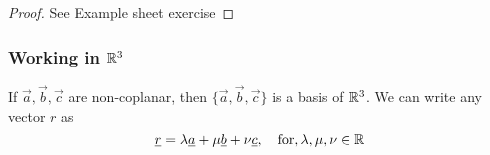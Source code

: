 \documentclass{article}
\numberwithin{equation}{section}
\begin{document}
\begin{proof}
    See Example sheet exercise
\end{proof}

\subsubsection*{Working in $\R^3$}
\begin{defi}[Basis in $\R^3$]
    If $\vec{a}, \vec{b}, \vec{c}$ are non-coplanar, then $\{\vec{a}, \vec{b}, \vec{c}\}$ is a basis of $\R^3$. We can write any vector $r$ as 
    \begin{equation}
        \underline{r} = \lambda \underline{a} + \mu \underline{b} + \nu \underline{c}, \quad \text{for}, \lambda, \mu, \nu \in \mathbb{R} \label{eq:2-24}
    \end{equation}
\end{defi}
\end{document}
